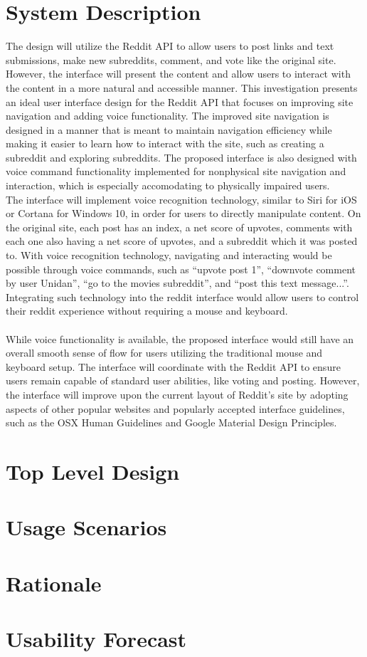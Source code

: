 \documentclass{article}
\begin{document}
\section{System Description} The design will utilize the Reddit API to allow users to post links and text submissions, make new subreddits, comment, and vote like the original site. However, the interface will present the content and allow users to interact with the content in a more natural and accessible manner. This investigation presents an ideal user interface design for the Reddit API that focuses on improving site navigation and adding voice functionality. The improved site navigation is designed in a manner that is meant to maintain navigation efficiency while making it easier to learn how to interact with the site, such as creating a subreddit and exploring subreddits. The proposed interface is also designed with voice command functionality implemented for nonphysical site navigation and interaction, which is especially accomodating to physically impaired users. 
\\
\indent The interface will implement voice recognition technology, similar to Siri for iOS or Cortana for Windows 10, in order for users to directly manipulate content. On the original site, each post has an index, a net score of upvotes, comments with each one also having a net score of upvotes, and a subreddit which it was posted to. With voice recognition technology, navigating and interacting would be possible through voice commands, such as ``upvote post 1'', ``downvote comment by user Unidan'', ``go to the movies subreddit'', and ``post this text message...''. Integrating such technology into the reddit interface would allow users to control their reddit experience without requiring a mouse and keyboard.\\
\\
\indent While voice functionality is available, the proposed interface would still have an overall smooth sense of flow for users utilizing the traditional mouse and keyboard setup. The interface will coordinate with the Reddit API to ensure users remain capable of standard user abilities, like voting and posting. However, the interface will improve upon the current layout of Reddit's site by adopting aspects of other popular websites and popularly accepted interface guidelines, such as the OSX Human Guidelines and Google Material Design Principles.

\section{Top Level Design}

\section{Usage Scenarios}

\section{Rationale}

\section{Usability Forecast}
\end{document}
